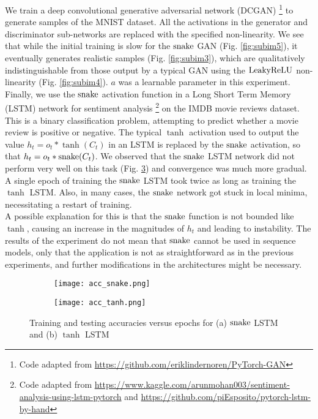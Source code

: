 We train a deep convolutional generative adversarial network (DCGAN) \footnote{Code adapted from \url{https://github.com/eriklindernoren/PyTorch-GAN}} \cite{radford2016unsupervised} to generate samples of the MNIST dataset. All the activations in the generator and discriminator sub-networks are replaced with the specified non-linearity. We see that while the initial training is slow for the $ \operatorname{snake} $ GAN (Fig. \ref{fig:subim5}), it eventually generates realistic samples (Fig. \ref{fig:subim3}), which are qualitatively indistinguishable from those output by a typical GAN using the $ \operatorname{LeakyReLU} $ non-linearity (Fig. \ref{fig:subim4}). $a$ was a learnable parameter in this experiment. \\

Finally, we use the $ \operatorname{snake} $ activation function in a Long Short Term Memory (LSTM) network for sentiment analysis
\footnote{Code adapted from \url{https://www.kaggle.com/arunmohan003/sentiment-analysis-using-lstm-pytorch} and \url{https://github.com/piEsposito/pytorch-lstm-by-hand}}
on the IMDB movie reviews dataset.
This is a binary classification problem, attempting to predict whether a movie review is positive or negative. The typical $ \tanh $ activation used to output the value $ h_{t} = o_{t} * \tanh(C_t) $ in an LSTM is replaced by the $ \operatorname{snake} $ activation, so that $h_{t} = o_{t} * \operatorname{snake}(C_{t})$.
We observed that the $ \operatorname{snake} $ LSTM network did not perform very well on this task (Fig. \ref{fig:lstm_acc}) and convergence was much more gradual. A single epoch of training the $ \operatorname{snake} $ LSTM took twice as long as training the $ \tanh $ LSTM.  Also, in many cases, the $ \operatorname{snake} $ network got stuck in local minima, necessitating a restart of training. \\

A possible explanation for this is that the $ \operatorname{snake} $ function is not bounded like $ \tanh $, causing an increase in the magnitudes of $ h_{t} $ and leading to instability. The results of the experiment do not mean that $ \operatorname{snake} $ cannot be used in sequence models, only that the application is not as straightforward as in the previous experiments, and further modifications in the architectures might be necessary.

\begin{figure}[h]
  \centering
  \begin{subfigure}{0.45\textwidth}
    \centering
    \texttt{[image: acc\_snake.png]}
    \caption{}
    \label{fig:subim8}
  \end{subfigure}
  \begin{subfigure}{0.45\textwidth}
    \centering
    \texttt{[image: acc\_tanh.png]}
    \caption{}
    \label{fig:subim9}
  \end{subfigure}
  \caption{Training and testing accuracies versus epochs for (a) $ \operatorname{snake} $ LSTM and (b) $ \tanh $ LSTM}
  \label{fig:lstm_acc}
\end{figure}


